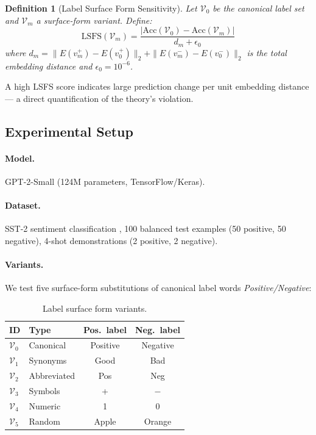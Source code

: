 \documentclass[11pt,a4paper]{article}
\newtheorem{definition}{Definition}
\begin{document}
\begin{definition}[Label Surface Form Sensitivity]
Let $\mathcal{V}_0$ be the canonical label set and
$\mathcal{V}_m$ a surface-form variant. Define:
\begin{equation}
\mathrm{LSFS}(\mathcal{V}_m) =
\frac{|\mathrm{Acc}(\mathcal{V}_0) -
      \mathrm{Acc}(\mathcal{V}_m)|}
     {d_m + \epsilon_0}
\label{eq:lsfs}
\end{equation}
where $d_m = \|E(v_m^+) - E(v_0^+)\|_2 +
             \|E(v_m^-) - E(v_0^-)\|_2$
is the total embedding distance and $\epsilon_0 = 10^{-6}$.
\end{definition}

A high LSFS score indicates large prediction change per
unit embedding distance — a direct quantification of
the theory's violation.

\subsection{Experimental Setup}

\paragraph{Model.} GPT-2-Small (124M parameters,
TensorFlow/Keras).

\paragraph{Dataset.} SST-2 sentiment classification
\citep{socher2013sst2}, 100 balanced test examples
(50 positive, 50 negative), 4-shot demonstrations
(2 positive, 2 negative).

\paragraph{Variants.} We test five surface-form substitutions
of canonical label words \textit{Positive/Negative}:

\begin{table}[h]
\centering
\small
\begin{tabular}{llcc}
\toprule
\textbf{ID} & \textbf{Type} &
\textbf{Pos.\ label} & \textbf{Neg.\ label} \\
\midrule
$\mathcal{V}_0$ & Canonical   & Positive & Negative \\
$\mathcal{V}_1$ & Synonyms    & Good     & Bad      \\
$\mathcal{V}_2$ & Abbreviated & Pos      & Neg      \\
$\mathcal{V}_3$ & Symbols     & +        & $-$      \\
$\mathcal{V}_4$ & Numeric     & 1        & 0        \\
$\mathcal{V}_5$ & Random      & Apple    & Orange   \\
\bottomrule
\end{tabular}
\caption{Label surface form variants.}
\label{tab:variants}
\end{table}
\end{document}
